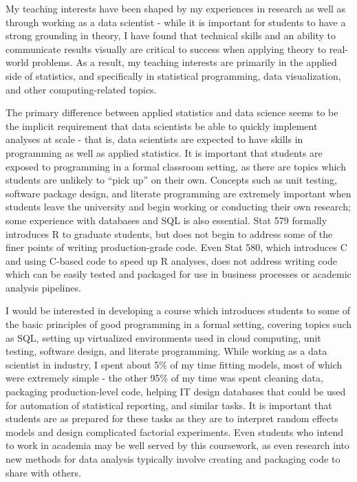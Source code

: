 \documentclass[12pt, letterpaper, sans]{moderncv}
\begin{document}
\vspace{.5cm}\hspace{8pt}
My teaching interests have been shaped by my experiences in research as well as through working as a data scientist - while it is important for students to have a strong grounding in theory, I have found that technical skills and an ability to communicate results visually are critical to success when applying theory to real-world problems. As a result, my teaching interests are primarily in the applied side of statistics, and specifically in statistical programming, data visualization, and other computing-related topics. 

The primary difference between applied statistics and data science seems to be the implicit requirement that data scientists be able to quickly implement analyses at scale - that is, data scientists are expected to have skills in programming as well as applied statistics. It is important that students are exposed to programming in a formal classroom setting, as there are topics which students are unlikely to ``pick up'' on their own. Concepts such as unit testing, software package design, and literate programming are extremely important when students leave the university and begin working or conducting their own research; some experience with databases and SQL is also essential. Stat 579 formally introduces R to graduate students, but does not begin to address some of the finer points of writing production-grade code. Even Stat 580, which introduces C and using C-based code to speed up R analyses, does not address writing code which can be easily tested and packaged for use in business processes or academic analysis pipelines. 

\vspace{.25cm}\hspace{8pt} I would be interested in developing a course which introduces students to some of the basic principles of good programming in a formal setting, covering topics such as SQL, setting up virtualized environments used in cloud computing, unit testing, software design, and literate programming. While working as a data scientist in industry, I spent about 5\% of my time fitting models, most of which were extremely simple - the other 95\% of my time was spent cleaning data, packaging production-level code, helping IT design databases that could be used for automation of statistical reporting, and similar tasks. It is important that students are as prepared for these tasks as they are to interpret random effects models and design complicated factorial experiments. Even students who intend to work in academia may be well served by this coursework, as even research into new methods for data analysis typically involve creating and packaging code to share with others. 
\end{document}
